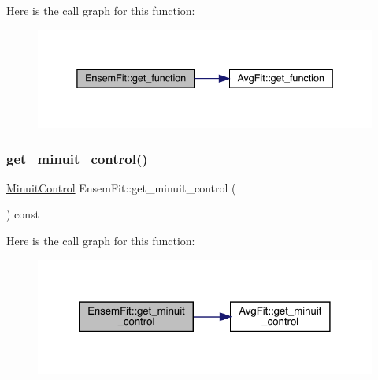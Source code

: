 Here is the call graph for this function\+:
\nopagebreak
\begin{figure}[H]
\begin{center}
\leavevmode
\includegraphics[width=338pt]{dc/dae/classEnsemFit_a0731f0c71cd1b0b6c9d26ebff9cc3620_cgraph}
\end{center}
\end{figure}
\mbox{\label{classEnsemFit_a47405314215c4adc9420af46dd5d9572}} 
\subsubsection{\texorpdfstring{get\_minuit\_control()}{get\_minuit\_control()}\hspace{0.1cm}{\footnotesize\ttfamily [1/2]}}
{\footnotesize\ttfamily \mbox{\hyperlink{structMinuitControl}{Minuit\+Control}} Ensem\+Fit\+::get\+\_\+minuit\+\_\+control (\begin{DoxyParamCaption}{ }\end{DoxyParamCaption}) const\hspace{0.3cm}{\ttfamily [inline]}}

Here is the call graph for this function\+:
\nopagebreak
\begin{figure}[H]
\begin{center}
\leavevmode
\includegraphics[width=322pt]{dc/dae/classEnsemFit_a47405314215c4adc9420af46dd5d9572_cgraph}
\end{center}
\end{figure}
\mbox{\label{classEnsemFit_a47405314215c4adc9420af46dd5d9572}} 
